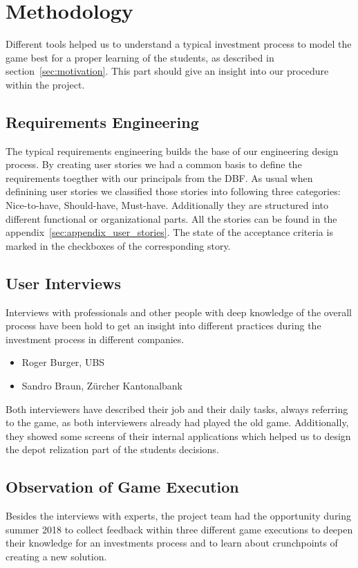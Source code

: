 \section{Methodology}
Different tools helped us to understand a typical investment process to model the game best for a proper learning of the students, as described in section~\ref{sec:motivation}. This part should give an insight into our procedure within the project.

\subsection{Requirements Engineering}
The typical requirements engineering builds the base of our engineering design process. By creating user stories we had a common basis to define the requirements toegther with our principals from the DBF. As usual when definining user stories we classified those stories into following three categories: Nice-to-have, Should-have, Must-have. Additionally they are structured into different functional or organizational parts. All the stories can be found in the appendix~\ref{sec:appendix_user_stories}. The state of the acceptance criteria is marked in the checkboxes of the corresponding story.

\subsection{User Interviews}
Interviews with professionals and other people with deep knowledge of the overall process have been hold to get an insight into different practices during the investment process in different companies.
\begin{itemize}
  \item Roger Burger, UBS
  \item Sandro Braun, Zürcher Kantonalbank
\end{itemize}

Both interviewers have described their job and their daily tasks, always referring to the game, as both interviewers already had played the old game. Additionally, they showed some screens of their internal applications which helped us to design the depot relization part of the students decisions.

\subsection{Observation of Game Execution}
Besides the interviews with experts, the project team had the opportunity during summer 2018 to collect feedback within three different game executions to deepen their knowledge for an investments process and to learn about crunchpoints of creating a new solution. \\

